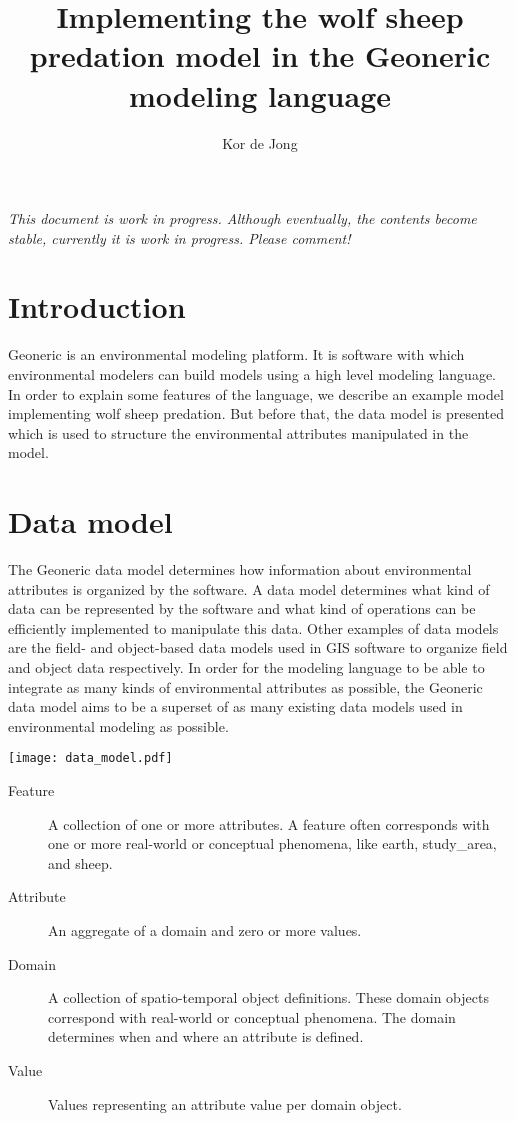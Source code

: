 \documentclass[10pt, a4paper]{article}
\begin{document}
\title{Implementing the wolf sheep predation model in the Geoneric modeling language}
\author{Kor de Jong}
\maketitle

\emph{This document is work in progress. Although eventually, the contents become stable, currently it is work in progress. Please comment!}

\section{Introduction}
Geoneric is an environmental modeling platform. It is software with which environmental modelers can build models using a high level modeling language. In order to explain some features of the language, we describe an example model implementing wolf sheep predation. But before that, the data model is presented which is used to structure the environmental attributes manipulated in the model.

\section{Data model}
The Geoneric data model determines how information about environmental attributes is organized by the software. A data model determines what kind of data can be represented by the software and what kind of operations can be efficiently implemented to manipulate this data. Other examples of data models are the field- and object-based data models used in GIS software to organize field and object data respectively. In order for the modeling language to be able to integrate as many kinds of environmental attributes as possible, the Geoneric data model aims to be a superset of as many existing data models used in environmental modeling as possible.

\texttt{[image: data\_model.pdf]}

\begin{description}
    \item[Feature] A collection of one or more attributes. A feature often corresponds with one or more real-world or conceptual phenomena, like earth, study\_area, and sheep.
    \item[Attribute] An aggregate of a domain and zero or more values.
    \item[Domain] A collection of spatio-temporal object definitions. These domain objects correspond with real-world or conceptual phenomena. The domain determines when and where an attribute is defined.
    \item[Value] Values representing an attribute value per domain object.
\end{description}
\end{document}
